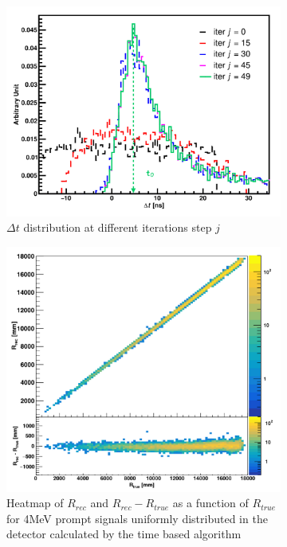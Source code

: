 \documentclass[../main.tex]{subfiles}
\begin{document}
\begin{figure}
  \begin{subfigure}[t]{0.48\textwidth}
    \centering
    \includegraphics[width=\textwidth]{images/juno/reco/delta_t_peak_distrib.png}
    \caption{$\Delta t$ distribution at different iterations step $j$}
    \label{fig:juno:rec:delta_t_distrib}
  \end{subfigure}
  \hfill
  \begin{subfigure}[t]{0.48\textwidth}
    \centering
    \includegraphics[width=\textwidth]{images/juno/reco/time_based_algorithm.png}
    \caption{Heatmap of $R_{rec}$ and $R_{rec} - R_{true}$ as a function of $R_{true}$ for 4MeV prompt signals uniformly distributed in the detector calculated by the time based algorithm}
    \label{fig:juno:rec:time_based_results}
  \end{subfigure}
  \caption{}
\end{figure}
\end{document}
